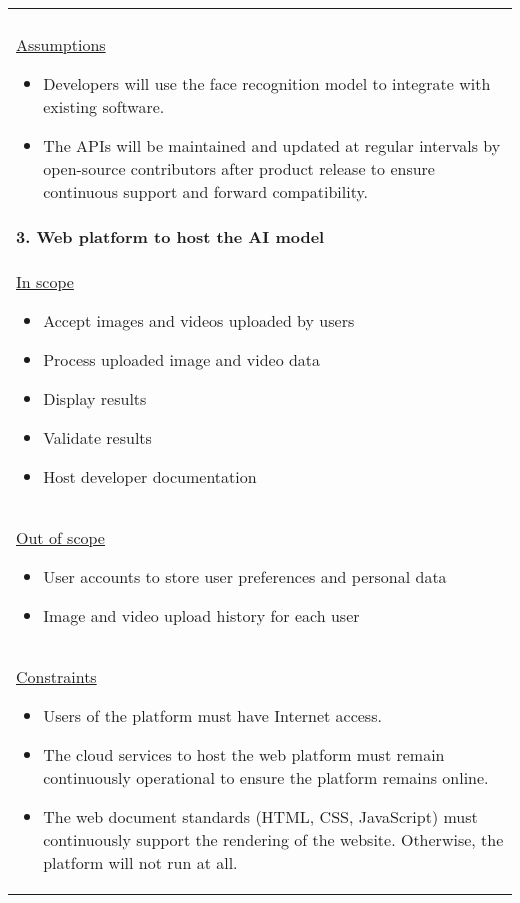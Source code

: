 \begin{longtable}{ | p{} l | }
{    } \\
    \multicolumn{2}{|p{\textwidth}|}{\hspace{0.6cm}\underline{Assumptions}
        \begin{itemize}
            \item Developers will use the face recognition model to integrate with existing software.
            \item The APIs will be maintained and updated at regular intervals by open-source contributors after product release to ensure continuous support and forward compatibility.
        \end{itemize}
    } \\
    \multicolumn{2}{|p{\textwidth}|}{\textbf{3. Web platform to host the AI model}} \\
    \multicolumn{2}{|p{\textwidth}|}{\hspace{0.6cm}\underline{In scope}
        \begin{itemize}
            \item Accept images and videos uploaded by users
            \item Process uploaded image and video data
            \item Display results
            \item Validate results
            \item Host developer documentation
        \end{itemize}
    } \\
    \multicolumn{2}{|p{\textwidth}|}{\hspace{0.6cm}\underline{Out of scope}
        \begin{itemize}
            \item User accounts to store user preferences and personal data
            \item Image and video upload history for each user
        \end{itemize}
    } \\
    \multicolumn{2}{|p{\textwidth}|}{\hspace{0.6cm}\underline{Constraints}
        \begin{itemize}
            \item Users of the platform must have Internet access.
            \item The cloud services to host the web platform must remain continuously operational to ensure the platform remains online.
            \item The web document standards (HTML, CSS, JavaScript) must continuously support the rendering of the website. Otherwise, the platform will not run at all.

\end{itemize}}
\end{longtable}

